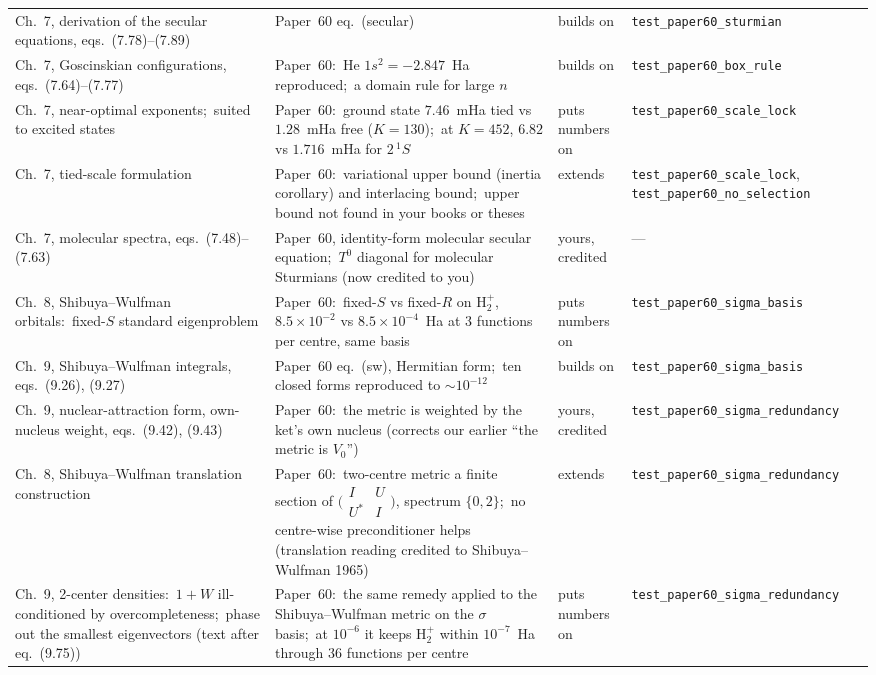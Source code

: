 \documentclass[11pt]{article}
\newcommand{\tst}[1]{\nolinkurl{#1}}
\begin{document}
{\begin{longtable}{>{\raggedright\arraybackslash}p{}>{\raggedright\arraybackslash}p{}>{\raggedright\arraybackslash}p{}>{\raggedright\arraybackslash}p{}}
Ch.~7, derivation of the secular equations, eqs.~(7.78)--(7.89) & Paper~60 eq.~(secular) & builds on & \tst{test_paper60_sturmian}\\
Ch.~7, Goscinskian configurations, eqs.~(7.64)--(7.77) & Paper~60:\ He $1s^2=-2.847$~Ha reproduced;\ a domain rule for large $n$ & builds on & \tst{test_paper60_box_rule}\\
Ch.~7, near-optimal exponents;\ suited to excited states & Paper~60:\ ground state $7.46$~mHa tied vs $1.28$~mHa free ($K=130$);\ at $K=452$, $6.82$ vs $1.716$~mHa for $2\,^1S$ & puts numbers on & \tst{test_paper60_scale_lock}\\
Ch.~7, tied-scale formulation & Paper~60:\ variational upper bound (inertia corollary) and interlacing bound;\ upper bound not found in your books or theses & extends & \tst{test_paper60_scale_lock}, \tst{test_paper60_no_selection}\\
Ch.~7, molecular spectra, eqs.~(7.48)--(7.63) & Paper~60, identity-form molecular secular equation;\ $T^0$ diagonal for molecular Sturmians (now credited to you) & yours, credited & ---\\
Ch.~8, Shibuya--Wulfman orbitals:\ fixed-$S$ standard eigenproblem & Paper~60:\ fixed-$S$ vs fixed-$R$ on $\mathrm{H}_2^+$, $8.5\times10^{-2}$ vs $8.5\times10^{-4}$~Ha at 3 functions per centre, same basis & puts numbers on & \tst{test_paper60_sigma_basis}\\
Ch.~9, Shibuya--Wulfman integrals, eqs.~(9.26), (9.27) & Paper~60 eq.~(sw), Hermitian form;\ ten closed forms reproduced to $\sim10^{-12}$ & builds on & \tst{test_paper60_sigma_basis}\\
Ch.~9, nuclear-attraction form, own-nucleus weight, eqs.~(9.42), (9.43) & Paper~60:\ the metric is weighted by the ket's own nucleus (corrects our earlier ``the metric is $V_0$'') & yours, credited & \tst{test_paper60_sigma_redundancy}\\
Ch.~8, Shibuya--Wulfman translation construction & Paper~60:\ two-centre metric a finite section of $\bigl(\begin{smallmatrix}I&U\\U^*&I\end{smallmatrix}\bigr)$, spectrum $\{0,2\}$;\ no centre-wise preconditioner helps (translation reading credited to Shibuya--Wulfman 1965) & extends & \tst{test_paper60_sigma_redundancy}\\
Ch.~9, 2-center densities:\ $1+W$ ill-conditioned by overcompleteness;\ phase out the smallest eigenvectors (text after eq.~(9.75)) & Paper~60:\ the same remedy applied to the Shibuya--Wulfman metric on the $\sigma$ basis;\ at $10^{-6}$ it keeps $\mathrm{H}_2^+$ within $10^{-7}$~Ha through 36 functions per centre & puts numbers on & \tst{test_paper60_sigma_redundancy}\\

\end{longtable}}
\end{document}
